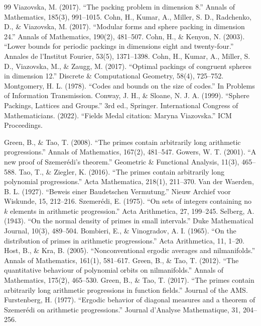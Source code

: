 \begin{thebibliography}{99}
 Viazovska, M. (2017). ``The packing problem in dimension 8.'' Annals of Mathematics, 185(3), 991--1015.
 Cohn, H., Kumar, A., Miller, S. D., Radchenko, D., \& Viazovska, M. (2017). ``Modular forms and sphere packing in dimension 24.'' Annals of Mathematics, 190(2), 481--507.
 Cohn, H., \& Kenyon, N. (2003). ``Lower bounds for periodic packings in dimensions eight and twenty-four.'' Annales de l'Institut Fourier, 53(5), 1371--1398.
 Cohn, H., Kumar, A., Miller, S. D., Viazovska, M., \& Zaugg, M. (2017). ``Optimal packings of congruent spheres in dimension 12.'' Discrete \& Computational Geometry, 58(4), 725--752.
 Montgomery, H. L. (1978). ``Codes and bounds on the size of codes.'' In Problems of Information Transmission.
 Conway, J. H., \& Sloane, N. J. A. (1999). ``Sphere Packings, Lattices and Groups.'' 3rd ed., Springer.
 International Congress of Mathematicians. (2022). ``Fields Medal citation: Maryna Viazovska.'' ICM Proceedings.

 Green, B., \& Tao, T. (2008). ``The primes contain arbitrarily long arithmetic progressions.'' Annals of Mathematics, 167(2), 481--547.
 Gowers, W. T. (2001). ``A new proof of Szemer\'edi's theorem.'' Geometric \& Functional Analysis, 11(3), 465--588.
 Tao, T., \& Ziegler, K. (2016). ``The primes contain arbitrarily long polynomial progressions.'' Acta Mathematica, 218(1), 211--370.
 Van der Waerden, B. L. (1927). ``Beweis einer Baudetschen Vermutung.'' Nieuw Archief voor Wiskunde, 15, 212--216.
 Szemer\'edi, E. (1975). ``On sets of integers containing no $k$ elements in arithmetic progression.'' Acta Arithmetica, 27, 199--245.
 Selberg, A. (1943). ``On the normal density of primes in small intervals.'' Duke Mathematical Journal, 10(3), 489--504.
 Bombieri, E., \& Vinogradov, A. I. (1965). ``On the distribution of primes in arithmetic progressions.'' Acta Arithmetica, 11, 1--20.
 Host, B., \& Kra, B. (2005). ``Nonconventional ergodic averages and nilmanifolds.'' Annals of Mathematics, 161(1), 581--617.
 Green, B., \& Tao, T. (2012). ``The quantitative behaviour of polynomial orbits on nilmanifolds.'' Annals of Mathematics, 175(2), 465--530.
 Green, B., \& Tao, T. (2017). ``The primes contain arbitrarily long arithmetic progressions in function fields.'' Journal of the AMS.
 Furstenberg, H. (1977). ``Ergodic behavior of diagonal measures and a theorem of Szemer\'edi on arithmetic progressions.'' Journal d'Analyse Mathematique, 31, 204--256.


\end{thebibliography}
